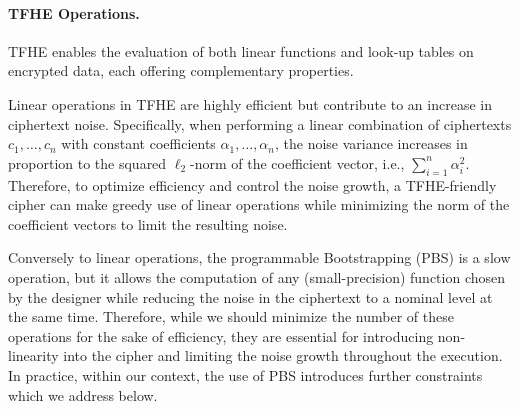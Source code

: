 %
%
%
 





\paragraph{TFHE Operations.} TFHE enables the evaluation of both linear functions and look-up tables on encrypted data, each offering complementary properties.

Linear operations in TFHE are highly efficient but contribute to an increase in ciphertext noise. Specifically, when performing a linear combination of ciphertexts $c_1, \ldots, c_n$ with constant coefficients $\alpha_1, \ldots, \alpha_n$, the noise variance increases in proportion to the squared $\ell_2$-norm of the coefficient vector, i.e., $\sum_{i=1}^n \alpha_i^2$.  Therefore, to optimize efficiency and control the noise growth, a TFHE-friendly cipher can make greedy use of linear operations while minimizing the norm of the coefficient vectors to limit the resulting noise.

Conversely to linear operations, the programmable Bootstrapping (PBS) is a slow operation, but it allows the computation of any (small-precision) function chosen by the designer while reducing the noise in the ciphertext to a nominal level at the same time. Therefore, while we should minimize the number of these operations for the sake of efficiency, they are essential for introducing non-linearity into the cipher and limiting the noise growth throughout the execution. In practice, within our context, the use of PBS introduces further constraints which we address below.

